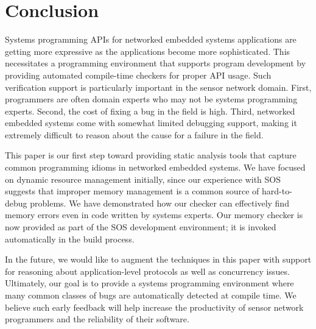 \section{Conclusion}
\label{sec:conc}

Systems programming APIs for networked embedded systems applications
are getting more expressive as the applications become more
sophisticated.  This necessitates a programming environment that
supports program development by providing automated compile-time
checkers for proper API usage.  Such verification support is
particularly important in the sensor network domain.  First,
programmers are often domain experts who may not be systems
programming experts. Second, the cost of fixing a bug in the field is
high.  Third, networked embedded systems come with somewhat limited
debugging support, making it extremely difficult to reason about the
cause for a failure in the field.

This paper is our first step toward providing static analysis tools
that capture common programming idioms in networked embedded systems.
We have focused on dynamic resource management initially, since our
experience with SOS suggests that improper memory management is a
common source of hard-to-debug problems.  We have demonstrated how our
checker can effectively find memory errors even in code written by
systems experts.  Our memory checker is now provided as part of the
SOS development environment; it is invoked automatically in the build
process.

In the future, we would like to augment the techniques in this paper
with support for reasoning about application-level protocols
\cite{AlurPOPL05,HJM05} as well as concurrency issues.  Ultimately,
our goal is to provide a systems programming environment where many
common classes of bugs are automatically detected at compile time.  We
believe such early feedback will help increase the productivity of
sensor network programmers and the reliability of their software.


